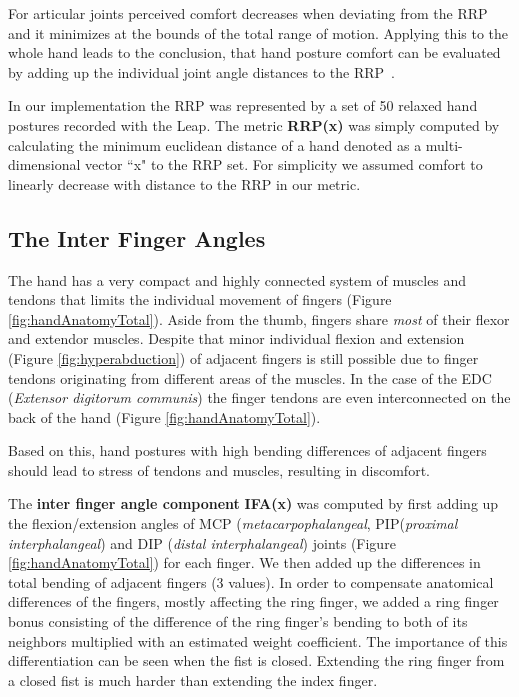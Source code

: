 \documentclass{sig-alternate-05-2015}
\begin{document}
For articular joints perceived comfort decreases when deviating from the RRP and it minimizes at the bounds of the total range of motion. Applying this to the whole hand leads to the conclusion, that hand posture comfort can be evaluated by adding up the individual joint angle distances to the RRP~\cite{naddeo2015proposal}.

In our implementation the RRP was represented by a set of 50 relaxed hand postures recorded with the Leap. The metric \textbf{RRP(x)} was simply computed by calculating the minimum euclidean distance of a hand denoted as a multi-dimensional vector ``x" to the RRP set.
For simplicity we assumed comfort to linearly decrease with distance to the RRP in our metric.

\subsection{The Inter Finger Angles}

The hand has a very compact and highly connected system of muscles and tendons that limits the individual movement of fingers (Figure \ref{fig:handAnatomyTotal}).
Aside from the thumb, fingers share \textsl{most} of their flexor and extendor muscles. Despite that minor individual flexion and extension (Figure \ref{fig:hyperabduction}) of adjacent fingers is still possible due to finger tendons originating from different areas of the muscles. In the case of the EDC (\textit{Extensor digitorum communis}) the finger tendons are even interconnected on the back of the hand (Figure \ref{fig:handAnatomyTotal}). 

Based on this, hand postures with high bending differences of adjacent fingers should lead to stress of tendons and muscles, resulting in discomfort.

The \textbf{inter finger angle component} \textbf{IFA(x)} was computed by first adding up the flexion/extension angles of MCP (\textit{metacarpophalangeal}, PIP(\textit{proximal interphalangeal}) and DIP (\textit{distal interphalangeal}) joints (Figure \ref{fig:handAnatomyTotal}) for each finger. We then added up the differences in total bending of adjacent fingers (3 values). In order to compensate anatomical differences of the fingers, mostly affecting the ring finger, we added a ring finger bonus consisting of the difference of the ring finger's bending to both of its neighbors multiplied with an estimated weight coefficient. The importance of this differentiation can be seen when the fist is closed. Extending the ring finger from a closed fist is much harder than extending the index finger. 
\end{document}
